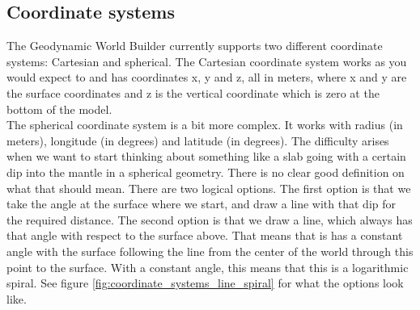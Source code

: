 \documentclass{book}
\newcommand{\GWB}{{Geodynamic World Builder}}
\begin{document}
\subsection{Coordinate systems}
\label{section:coordinate_systems}
The \GWB{} currently supports two different coordinate systems: Cartesian and spherical. The Cartesian coordinate system works as you would expect to and has coordinates x, y and z, all in meters, where x and y are the surface coordinates and z is the vertical coordinate which is zero at the bottom of the model. 
\\
The spherical coordinate system is a bit more complex. It works with radius (in meters), longitude (in degrees) and latitude (in degrees). The difficulty arises when we want to start thinking about something like a slab going with a certain dip into the mantle in a spherical geometry. There is no clear good definition on what that should mean. There are two logical options. The first option is that we take the angle at the surface where we start, and draw a line with that dip for the required distance. The second option is that we draw a line, which always has that angle with respect to the surface above. That means that is has a constant angle with the surface following the line from the center of the world through this point to the surface. With a constant angle, this means that this is a logarithmic spiral. See figure \ref{fig:coordinate_systems_line_spiral} for what the options look like.
\end{document}
